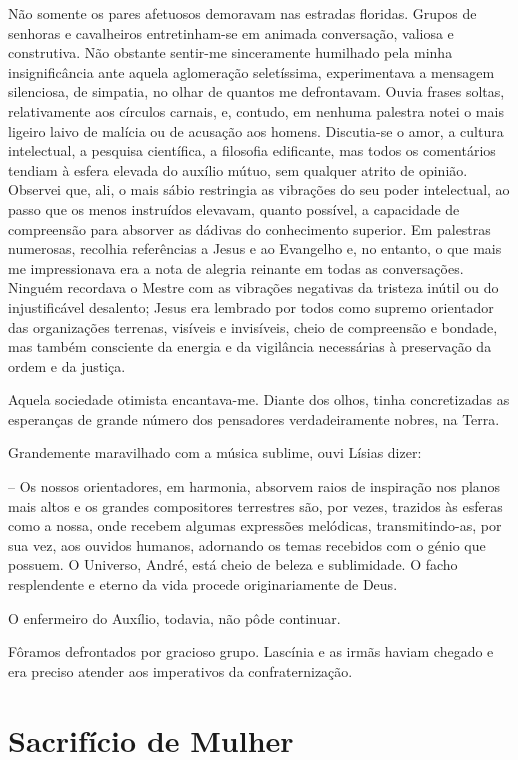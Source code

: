 \documentclass[portuguese,12pt,a4paper]{scrbook}
\begin{document}
	Não somente os pares afetuosos demoravam nas estradas floridas. Grupos de senhoras e cavalheiros entretinham-se em animada conversação, valiosa e construtiva. Não obstante sentir-me sinceramente humilhado pela minha insignificância ante aquela aglomeração seletíssima, experimentava a mensagem silenciosa, de simpatia, no olhar de quantos me defrontavam. Ouvia frases soltas, relativamente aos círculos carnais, e, contudo, em nenhuma palestra notei o mais ligeiro laivo de malícia ou de acusação aos homens. Discutia-se o amor, a cultura intelectual, a pesquisa científica, a filosofia edificante, mas todos os comentários tendiam à esfera elevada do auxílio mútuo, sem qualquer atrito de opinião. Observei que, ali, o mais sábio restringia as vibrações do seu poder intelectual, ao passo que os menos instruídos elevavam, quanto possível, a capacidade de compreensão para absorver as dádivas do conhecimento superior. Em palestras numerosas, recolhia referências a Jesus e ao Evangelho e, no entanto, o que mais me impressionava era a nota de alegria reinante em todas as conversações. Ninguém recordava o Mestre com as vibrações negativas da tristeza inútil ou do injustificável desalento; Jesus era lembrado por todos como supremo orientador das organizações terrenas, visíveis e invisíveis, cheio de compreensão e bondade, mas também consciente da energia e da vigilância necessárias à preservação da ordem e da justiça.
	
	Aquela sociedade otimista encantava-me. Diante dos olhos, tinha concretizadas as esperanças de grande número dos pensadores verdadeiramente nobres, na Terra.
	
	
	Grandemente maravilhado com a música sublime, ouvi Lísias dizer:
	
	– Os nossos orientadores, em harmonia, absorvem raios de inspiração nos planos mais altos e os grandes compositores terrestres são, por vezes, trazidos às esferas como a nossa, onde recebem algumas expressões melódicas, transmitindo-as, por sua vez, aos ouvidos humanos, adornando os temas recebidos com o génio que possuem. O Universo, André, está cheio de beleza e sublimidade. O facho resplendente e eterno da vida procede originariamente de Deus.
	
	O enfermeiro do Auxílio, todavia, não pôde continuar.
	
	Fôramos defrontados por gracioso grupo. Lascínia e as irmãs haviam chegado e era preciso atender aos imperativos da confraternização.
	
	
	\chapter{Sacrifício de Mulher}
	
\end{document}

